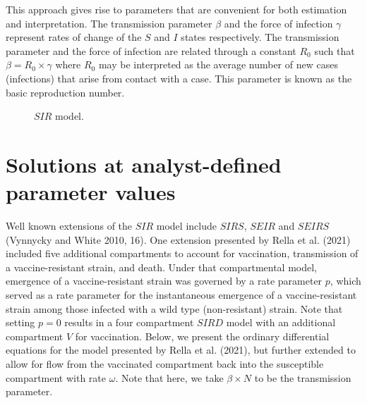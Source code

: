 \documentclass[
  11pt,
  letterpaper,
  DIV=11,
  numbers=noendperiod]{scrartcl}
\begin{document}
This approach gives rise to parameters that are convenient for both
estimation and interpretation. The transmission parameter \(\beta\) and
the force of infection \(\gamma\) represent rates of change of the \(S\)
and \(I\) states respectively. The transmission parameter and the force
of infection are related through a constant \(R_0\) such that
\(\beta = R_0 \times \gamma\) where \(R_0\) may be interpreted as the
average number of new cases (infections) that arise from contact with a
case. This parameter is known as the basic reproduction number.

\begin{figure}[H]
\caption{$SIR$ model.}
\begin{center}
\end{center}
\end{figure}

\hypertarget{solutions-at-analyst-defined-parameter-values}{%
\section{Solutions at analyst-defined parameter
values}\label{solutions-at-analyst-defined-parameter-values}}

Well known extensions of the \(SIR\) model include \(SIRS\), \(SEIR\)
and \(SEIRS\) (Vynnycky and White 2010, 16). One extension presented by
Rella et al. (2021) included five additional compartments to account for
vaccination, transmission of a vaccine-resistant strain, and death.
Under that compartmental model, emergence of a vaccine-resistant strain
was governed by a rate parameter \(p\), which served as a rate parameter
for the instantaneous emergence of a vaccine-resistant strain among
those infected with a wild type (non-resistant) strain. Note that
setting \(p = 0\) results in a four compartment \(SIRD\) model with an
additional compartment \(V\) for vaccination. Below, we present the
ordinary differential equations for the model presented by Rella et al.
(2021), but further extended to allow for flow from the vaccinated
compartment back into the susceptible compartment with rate \(\omega\).
Note that here, we take \(\beta \times N\) to be the transmission
parameter.
\end{document}
